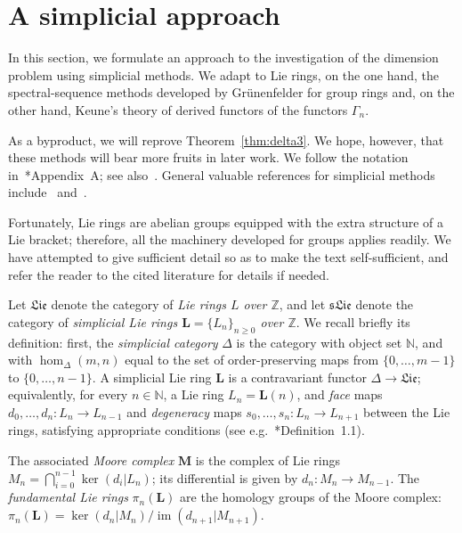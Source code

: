 \documentclass[a4paper,reqno,notitlepage]{amsart}
\theoremstyle{definition}
\newcommand{\N}{\mathbb N}
\newcommand{\Z}{\mathbb Z}
\begin{document}
\section{A simplicial approach}
In this section, we formulate an approach to the investigation of the
dimension problem using simplicial methods. We adapt to Lie rings, on
the one hand, the spectral-sequence methods developed by Gr\"unenfelder
for group rings and, on the other hand, Keune's theory of derived
functors of the functors $\varGamma_n$.

As a byproduct, we will reprove Theorem~\ref{thm:delta3}. We hope,
however, that these methods will bear more fruits in later work. We
follow the notation in~\cite{MP:09}*{Appendix~A}; see
also~\cite{Ellis:93}. General valuable references for simplicial
methods include~\cite{May:67} and~\cite{Goerss-Jardine:99}.

Fortunately, Lie rings are abelian groups equipped with the extra
structure of a Lie bracket; therefore, all the machinery developed for
groups applies readily. We have attempted to give sufficient detail so
as to make the text self-sufficient, and refer the reader to the cited
literature for details if needed.

\newcommand\Lie{\mathfrak{Lie}}
\newcommand\sLie{\mathfrak{sLie}}
\newcommand\asLie{\mathfrak{asLie}}
\newcommand\Ass{\mathfrak{Ass}}
\newcommand\sAss{\mathfrak{sAss}}

Let $\Lie$ denote the category of \emph{Lie rings $L$ over $\Z$}, and
let $\sLie$ denote the category of \emph{simplicial Lie rings $\mathbf
  L=\{L_n\}_{n\geq 0}$ over $\Z$}. We recall briefly its definition:
first, the \emph{simplicial category} $\Delta$ is the category with
object set $\N$, and with $\hom_\Delta(m,n)$ equal to the set of
order-preserving maps from $\{0,\dots,m-1\}$ to $\{0,\dots,n-1\}$. A
simplicial Lie ring $\mathbf L$ is a contravariant functor
$\Delta\to\Lie$; equivalently, for every $n\in\N$, a Lie ring
$L_n=\mathbf L(n)$, and \emph{face} maps $d_0,\dots,d_n:L_n\to
L_{n-1}$ and \emph{degeneracy} maps $s_0,\dots,s_n:L_n\to L_{n+1}$
between the Lie rings, satisfying appropriate conditions (see
e.g.~\cite{May:67}*{Definition~1.1}).

The associated \emph{Moore complex} $\mathbf M$ is the complex of Lie
rings $M_n=\bigcap_{i=0}^{n-1}\ker(d_i|L_n)$; its differential is
given by $d_n:M_n\to M_{n-1}$. The \emph{fundamental Lie rings}
$\pi_n(\mathbf L)$ are the homology groups of the Moore complex:
$\pi_n(\mathbf L)=\ker(d_n|M_n)/\operatorname{im}(d_{n+1}|M_{n+1})$.
\end{document}
